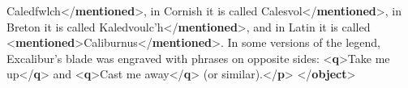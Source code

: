 \begin{shaded}
Caledfwlch{</\textbf{mentioned}>}, in Cornish it is called\mbox{}\newline 
{}Calesvol{</\textbf{mentioned}>}, in Breton it is called\mbox{}\newline 
{}Kaledvoulc'h{</\textbf{mentioned}>}, and in Latin it is\mbox{}\newline 
\hspace*{1em}\hspace*{1em} called {<\textbf{mentioned}>}Caliburnus{</\textbf{mentioned}>}. In some versions\mbox{}\newline 
\hspace*{1em}\hspace*{1em} of the legend, Excalibur’s blade was engraved with phrases on opposite\mbox{}\newline 
\hspace*{1em}\hspace*{1em} sides: {<\textbf{q}>}Take me up{</\textbf{q}>} and {<\textbf{q}>}Cast me away{</\textbf{q}>} (or similar).{</\textbf{p}>}\mbox{}\newline 
{</\textbf{object}>}\end{shaded}\egroup\par \par
